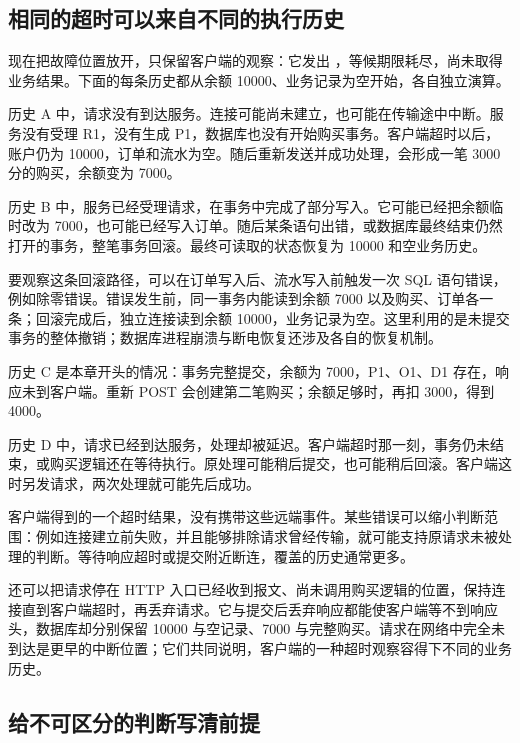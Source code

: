 \subsection*{相同的超时可以来自不同的执行历史}

现在把故障位置放开，只保留客户端的观察：它发出 ，等候期限耗尽，尚未取得业务结果。下面的每条历史都从余额 10000、业务记录为空开始，各自独立演算。

历史 A 中，请求没有到达服务。连接可能尚未建立，也可能在传输途中中断。服务没有受理 R1，没有生成 P1，数据库也没有开始购买事务。客户端超时以后，账户仍为 10000，订单和流水为空。随后重新发送并成功处理，会形成一笔 3000 分的购买，余额变为 7000。

历史 B 中，服务已经受理请求，在事务中完成了部分写入。它可能已经把余额临时改为 7000，也可能已经写入订单。随后某条语句出错，或数据库最终结束仍然打开的事务，整笔事务回滚。最终可读取的状态恢复为 10000 和空业务历史。

要观察这条回滚路径，可以在订单写入后、流水写入前触发一次 SQL 语句错误，例如除零错误。错误发生前，同一事务内能读到余额 7000 以及购买、订单各一条；回滚完成后，独立连接读到余额 10000，业务记录为空。这里利用的是未提交事务的整体撤销；数据库进程崩溃与断电恢复还涉及各自的恢复机制。

历史 C 是本章开头的情况：事务完整提交，余额为 7000，P1、O1、D1 存在，响应未到客户端。重新 POST 会创建第二笔购买；余额足够时，再扣 3000，得到 4000。

历史 D 中，请求已经到达服务，处理却被延迟。客户端超时那一刻，事务仍未结束，或购买逻辑还在等待执行。原处理可能稍后提交，也可能稍后回滚。客户端这时另发请求，两次处理就可能先后成功。



客户端得到的一个超时结果，没有携带这些远端事件。某些错误可以缩小判断范围：例如连接建立前失败，并且能够排除请求曾经传输，就可能支持原请求未被处理的判断。等待响应超时或提交附近断连，覆盖的历史通常更多。

还可以把请求停在 HTTP 入口已经收到报文、尚未调用购买逻辑的位置，保持连接直到客户端超时，再丢弃请求。它与提交后丢弃响应都能使客户端等不到响应头，数据库却分别保留 10000 与空记录、7000 与完整购买。请求在网络中完全未到达是更早的中断位置；它们共同说明，客户端的一种超时观察容得下不同的业务历史。

\subsection*{给不可区分的判断写清前提}

